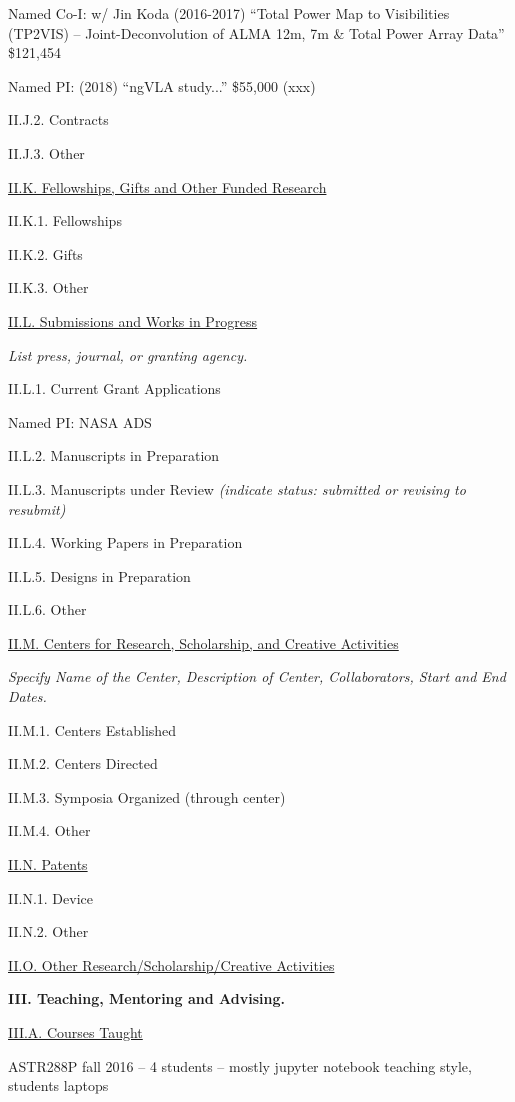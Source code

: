 \documentclass[11pt,letterpaper]{article}
\begin{document}
Named Co-I: w/ Jin Koda (2016-2017)
``Total Power Map to Visibilities (TP2VIS) -- Joint-Deconvolution of ALMA 12m, 7m \& Total Power Array Data''
		\$121,454

Named PI: (2018)
``ngVLA study...'' \$55,000 (xxx)

II.J.2. Contracts

II.J.3. Other


\underline{II.K. Fellowships, Gifts and Other Funded Research}

II.K.1. Fellowships

II.K.2. Gifts

II.K.3. Other


\underline{II.L. Submissions and Works in Progress}

\textit{List press, journal, or granting agency.}

II.L.1. Current Grant Applications

Named PI: NASA ADS

II.L.2. Manuscripts in Preparation

II.L.3. Manuscripts under Review \textit{(indicate status:  submitted or revising to resubmit)}

II.L.4. Working Papers in Preparation

II.L.5. Designs in Preparation

II.L.6. Other


\underline{II.M. Centers for Research, Scholarship, and Creative Activities}

\textit{Specify Name of the Center, Description of Center, Collaborators, Start and End Dates.}

II.M.1. Centers Established

II.M.2. Centers Directed

II.M.3. Symposia Organized (through center)

II.M.4. Other


\underline{II.N. Patents}

II.N.1. Device

II.N.2. Other


\underline{II.O. Other Research/Scholarship/Creative Activities}


\textbf{III. Teaching, Mentoring and Advising.}


\underline{III.A. Courses Taught}


ASTR288P fall 2016 --  4 students -- mostly jupyter notebook teaching style, students laptops
\end{document}
